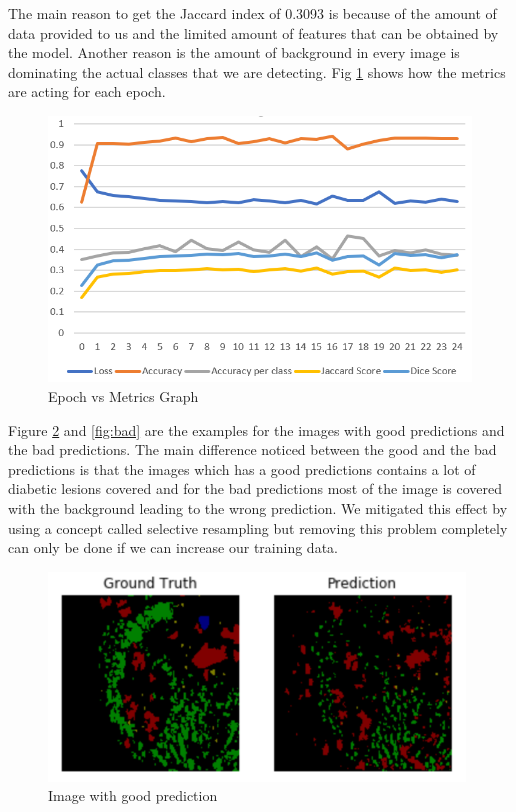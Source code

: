 \documentclass[conference]{IEEEtran}
\begin{document}
The main reason to get the Jaccard index of 0.3093 is because of the amount of data provided to us and the limited amount of features that can be obtained by the model. Another reason is the amount of background in every image is dominating the actual classes that we are detecting. Fig  \ref{fig:epoch} shows how the metrics are acting for each epoch.
              
\begin{figure}[H]
	\centering
	\includegraphics[width=\linewidth]{image/epochvsmetrics.PNG}
	\caption{Epoch vs Metrics Graph}
	\label{fig:epoch}
\end{figure}

Figure \ref{fig:good} and \ref{fig:bad} are the examples for the images with good predictions and the bad predictions. The main difference noticed between the  good and the bad predictions is that the images which has a good predictions contains a lot of diabetic lesions covered and for the bad predictions most of the image is covered with the background leading to the wrong prediction. We mitigated this effect by using a concept called selective resampling but removing this problem completely can only be done if we can increase our training data.

              
\begin{figure}[H]
	\centering
	\includegraphics[width=\linewidth]{image/good.PNG}
	\caption{Image with good prediction}
	\label{fig:good}
\end{figure}
  
\end{document}
